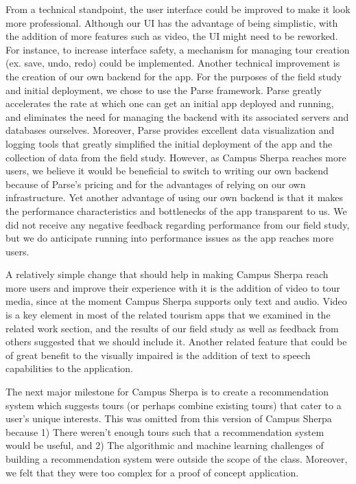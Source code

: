 \documentclass{sigchi}
\begin{document}
From a technical standpoint, the user interface could be improved to make it look more professional. Although our UI has the advantage of being simplistic, with the addition of more features such as video, the UI might need to be reworked. For instance, to increase interface safety, a mechanism for managing tour creation (ex. save, undo, redo) could be implemented. Another technical improvement is the creation of our own backend for the app. For the purposes of the field study and initial deployment, we chose to use the Parse framework. Parse greatly accelerates the rate at which one can get an initial app deployed and running, and eliminates the need for managing the backend with its associated servers and databases ourselves. Moreover, Parse provides excellent data visualization and logging tools that greatly simplified the initial deployment of the app and the collection of data from the field study. However, as Campus Sherpa reaches more users, we believe it would be beneficial to switch to writing our own backend because of Parse's pricing and for the advantages of relying on our own infrastructure. Yet another advantage of using our own backend is that it makes the performance characteristics and bottlenecks of the app transparent to us. We did not receive any negative feedback regarding performance from our field study, but we do anticipate running into performance issues as the app reaches more users. 

A relatively simple change that should help in making Campus Sherpa reach more users and improve their experience with it is the addition of video to tour media, since at the moment Campus Sherpa supports only text and audio. Video is a key element in most of the related tourism apps that we examined in the related work section, and the results of our field study as well as feedback from others suggested that we should include it. Another related feature that could be of great benefit to the visually impaired is the addition of text to speech capabilities to the application. 

The next major milestone for Campus Sherpa is to create a recommendation system which suggests tours (or perhaps combine existing tours) that cater to a user's unique interests. This was omitted from this version of Campus Sherpa because 1) There weren't enough tours such that a recommendation system would be useful, and 2) The algorithmic and machine learning challenges of building a recommendation system were outside the scope of the class. Moreover, we felt that they were too complex for a proof of concept application. 
\end{document}
